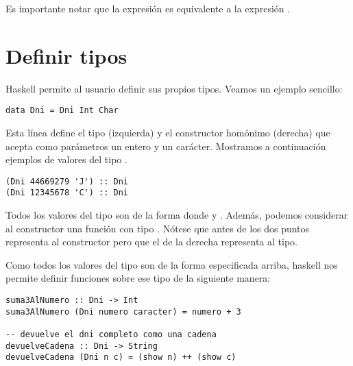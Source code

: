 Es importante notar que la expresión  es
equivalente a la expresión .

\section{Definir tipos}
Haskell permite al usuario definir sus propios tipos. Veamos
un ejemplo sencillo:
\begin{verbatim}
data Dni = Dni Int Char
\end{verbatim}
Esta línea define el tipo  (izquierda) y el constructor
homónimo (derecha) que acepta como parámetros un entero y un carácter.
Mostramos a continuación ejemplos de valores del tipo .
\begin{verbatim}
(Dni 44669279 'J') :: Dni
(Dni 12345678 'C') :: Dni
\end{verbatim}
Todos los valores del tipo  son de la forma
 donde  y . Además,
podemos considerar al constructor  una función con tipo
. Nótese que
 antes de los dos puntos representa al constructor pero
que el  de la derecha representa al tipo.

Como todos los valores del tipo  son de la forma especificada
arriba, haskell nos permite definir funciones sobre ese tipo de la
siguiente manera:
\begin{verbatim}
suma3AlNumero :: Dni -> Int
suma3AlNumero (Dni numero caracter) = numero + 3

-- devuelve el dni completo como una cadena
devuelveCadena :: Dni -> String
devuelveCadena (Dni n c) = (show n) ++ (show c)
\end{verbatim}

